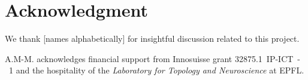 
\section*{Acknowledgment}

We thank [names alphabetically] for insightful discussion related to this project.

A.M-M. acknowledges financial support from Innosuisse grant 32875.1~IP-ICT~-~1 and the hospitality of the \textit{Laboratory for Topology and Neuroscience} at EPFL.

